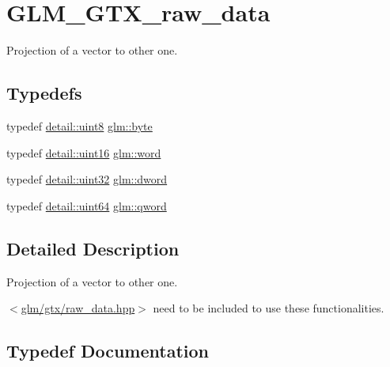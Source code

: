 \hypertarget{group__gtx__raw__data}{}\section{G\+L\+M\+\_\+\+G\+T\+X\+\_\+raw\+\_\+data}
\label{group__gtx__raw__data}


Projection of a vector to other one.  


\subsection*{Typedefs}
\begin{DoxyCompactItemize}
\item 
typedef \mbox{\hyperlink{namespaceglm_1_1detail_aef2588f97d090cc19fbbe0c74fe17c8f}{detail\+::uint8}} \mbox{\hyperlink{group__gtx__raw__data_gacd7fe1f2ad60a57f7d7ad4f1e6836efd}{glm\+::byte}}
\item 
typedef \mbox{\hyperlink{namespaceglm_1_1detail_a47b2a7d006d187338e8031a352d1ce56}{detail\+::uint16}} \mbox{\hyperlink{group__gtx__raw__data_ga5617a479d471021b5c773c5e969ba46d}{glm\+::word}}
\item 
typedef \mbox{\hyperlink{namespaceglm_1_1detail_ade6cfbf377022aaa391af8cd50489222}{detail\+::uint32}} \mbox{\hyperlink{group__gtx__raw__data_ga1fc2589df6d44e923cd1820cf14805cf}{glm\+::dword}}
\item 
typedef \mbox{\hyperlink{namespaceglm_1_1detail_adec4b19bf4982125e122db2fe03c5810}{detail\+::uint64}} \mbox{\hyperlink{group__gtx__raw__data_ga32447af289e879589883c9b7e3be1246}{glm\+::qword}}
\end{DoxyCompactItemize}


\subsection{Detailed Description}
Projection of a vector to other one. 

$<$\mbox{\hyperlink{raw__data_8hpp}{glm/gtx/raw\+\_\+data.\+hpp}}$>$ need to be included to use these functionalities. 

\subsection{Typedef Documentation}
\mbox{\label{group__gtx__raw__data_gacd7fe1f2ad60a57f7d7ad4f1e6836efd}} 
